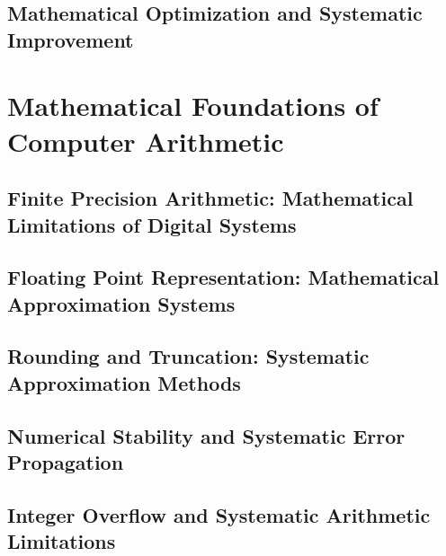 \documentclass[12pt, oneside, openany]{book}
\begin{document}
\section{Mathematical Optimization and Systematic Improvement}


\chapter{Mathematical Foundations of Computer Arithmetic}

\section{Finite Precision Arithmetic: Mathematical Limitations of Digital Systems}

\section{Floating Point Representation: Mathematical Approximation Systems}

\section{Rounding and Truncation: Systematic Approximation Methods}

\section{Numerical Stability and Systematic Error Propagation}

\section{Integer Overflow and Systematic Arithmetic Limitations}
\end{document}
